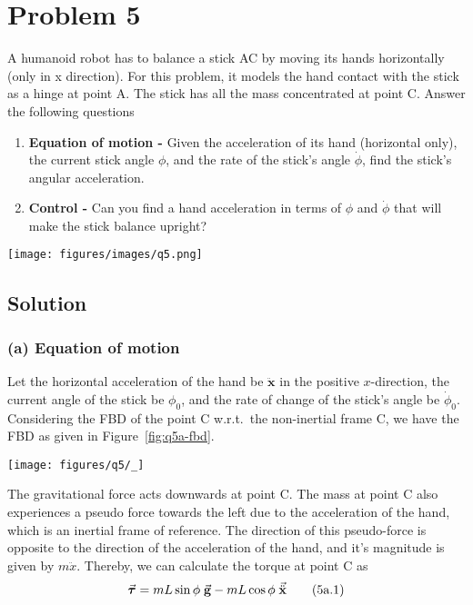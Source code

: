 \section*{Problem 5}

A humanoid robot has to balance a stick AC by moving its hands horizontally (only in x direction).
For this problem, it models the hand contact with the stick as a hinge at point A.
The stick has all the mass concentrated at point C.
Answer the following questions

\begin{enumerate}[label = (\alph*)]
    \item \textbf{Equation of motion -} Given the acceleration of its hand (horizontal only), the current stick angle \( \phi \), and the rate of the stick's angle \( \dot\phi \), find the stick's angular acceleration.
    \item \textbf{Control -} Can you find a hand acceleration in terms of \( \phi \) and \( \dot\phi \) that will make the stick balance upright?
\end{enumerate}

\begin{figure*}[h]
    \centering
    \texttt{[image: figures/images/q5.png]}
\end{figure*}

\subsection*{Solution}

\subsubsection*{(a) Equation of motion}

Let the horizontal acceleration of the hand be \( \mathbf{\ddot x} \) in the positive \(x\)-direction, the current angle of the stick be \( \phi_0 \), and the rate of change of the stick's angle be \( \dot\phi_0 \).
Considering the FBD of the point C w.r.t.\ the non-inertial frame C, we have the FBD as given in Figure~\ref{fig:q5a-fbd}.

\begin{figure*}[htb]
    \centering
    \texttt{[image: figures/q5/\_]}
    \caption{
        Free body diagram of the stick.
    }\label{fig:q5a-fbd}
\end{figure*}

The gravitational force acts downwards at point C.
The mass at point C also experiences a pseudo force towards the left due to the acceleration of the hand, which is an inertial frame of reference.
The direction of this pseudo-force is opposite to the direction of the acceleration of the hand, and it's magnitude is given by \( m\ddot x \).
Thereby, we can calculate the torque at point C as
\begin{equation}
    \vec{\boldsymbol{\tau}} = mL\sin\phi \; \vec{\mathbf{g}} - mL\cos\phi \; \vec{\ddot{\mathbf{x}}} \\
    \tag{5a.1}
\end{equation}

